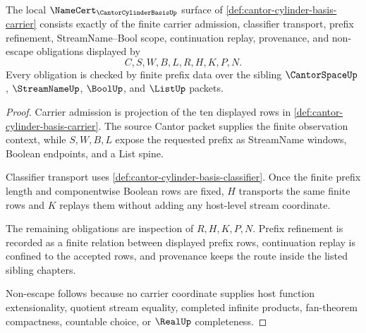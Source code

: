 \begin{theorem}
\label{thm:cantor-cylinder-basis-namecert-obligations}
The local $\NameCert_{\CantorCylinderBasisUp}$ surface of
\autoref{def:cantor-cylinder-basis-carrier} consists exactly of the finite
carrier admission, classifier transport, prefix refinement, StreamName--Bool
scope, continuation replay, provenance, and non-escape obligations displayed
by
$$
C,S,W,B,L,R,H,K,P,N .
$$
Every obligation is checked by finite prefix data over the sibling
$\CantorSpaceUp$, $\StreamNameUp$, $\BoolUp$, and $\ListUp$ packets.
\end{theorem}
\begin{proof}
Carrier admission is projection of the ten displayed rows in
\autoref{def:cantor-cylinder-basis-carrier}. The source Cantor packet supplies
the finite observation context, while $S,W,B,L$ expose the requested prefix as
StreamName windows, Boolean endpoints, and a List spine.

Classifier transport uses
\autoref{def:cantor-cylinder-basis-classifier}. Once the finite prefix length
and componentwise Boolean rows are fixed, $H$ transports the same finite
rows and $K$ replays them without adding any host-level stream coordinate.

The remaining obligations are inspection of $R,H,K,P,N$. Prefix refinement is
recorded as a finite relation between displayed prefix rows, continuation
replay is confined to the accepted rows, and provenance keeps the route inside
the listed sibling chapters.

Non-escape follows because no carrier coordinate supplies host function
extensionality, quotient stream equality, completed infinite products,
fan-theorem compactness, countable choice, or $\RealUp$ completeness.
\end{proof}


